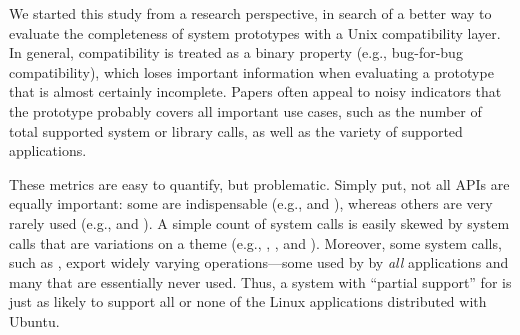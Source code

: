 \label{sec:metric:definitions}

We started this study from a research perspective, in search of a better way to evaluate
the completeness of system prototypes with a Unix compatibility layer.
In general, compatibility is treated as a binary property
(e.g., bug-for-bug compatibility), which loses 
important information when evaluating a prototype that is almost certainly incomplete.
Papers often appeal to noisy indicators that the prototype probably covers all important use cases,
such as the number of total supported system or library calls, as well as the variety
of supported applications.


These metrics are easy to quantify, but problematic.
Simply put, not all APIs are equally important: some are indispensable (e.g.,  and ),
whereas others are very rarely used (e.g.,  and ).
A simple count of system calls is easily skewed by 
system calls that are variations on a theme (e.g., , , and ).
Moreover, some system calls, such as ,
export widely varying operations---some used by 
by {\em all} applications and many that are essentially never used.
Thus, a system with ``partial support'' for 
is just as likely to support all or none of the Linux applications distributed with Ubuntu.





